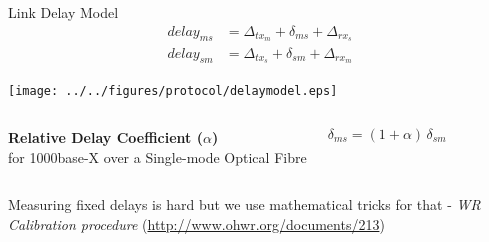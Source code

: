 \documentclass[compress,red]{beamer}
\begin{document}
\begin{frame}{Link Delay Model}
 \begin{align}
   \nonumber delay_{ms} &= \Delta_{tx_m} + \delta_{ms} + \Delta_{rx_s} \\
   \nonumber delay_{sm} &= \Delta_{tx_s} + \delta_{sm} + \Delta_{rx_m}
 \end{align}

  \vspace{0.2cm}

 \begin{center}
 \texttt{[image: ../../figures/protocol/delaymodel.eps]}
 \end{center}

  {
 \begin{columns}[c]
   \column{2.8in}
 
     \begin{center}
       \textbf{Relative Delay Coefficient ($\alpha$)} \\
       for 1000base-X over a Single-mode Optical Fibre
     \end{center}
 
   \column{1.5in}
     \begin{center}
       \begin{equation}
       \nonumber \delta_{ms} = (1 + \alpha) \, \delta_{sm}
       \end{equation}
     \end{center}
     \vspace{0.5cm}
 \end{columns}}

  {
 \begin{block}{Measuring fixed delays is hard}
 	but we use mathematical tricks for that - \emph{WR Calibration procedure} (\url{http://www.ohwr.org/documents/213})
 \end{block}}

\end{frame}
\end{document}
